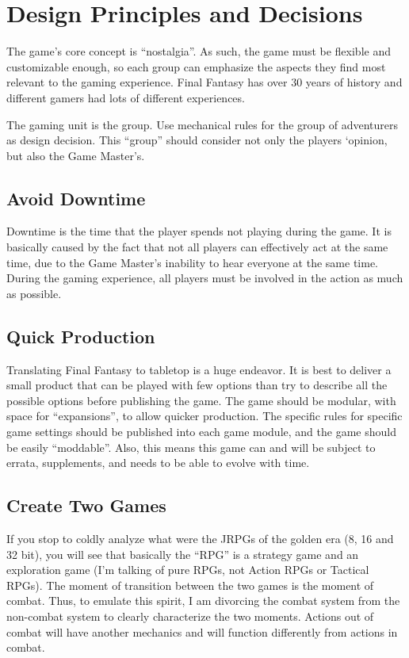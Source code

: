 \section{Design Principles and Decisions}\label{sec:design}
\begin{multicols}{2}
The game's core concept is “nostalgia”. As such, the game must be flexible and customizable enough, so each group can emphasize the aspects they find most relevant to the gaming experience. Final Fantasy has over 30 years of history and different gamers had lots of different experiences.

The gaming unit is the group. Use mechanical rules for the group of adventurers as design decision. This “group” should consider not only the players ‘opinion, but also the Game Master's.

\subsection{Avoid Downtime}\label{subsec:downtime} 
Downtime is the time that the player spends not playing during the game. It is basically caused by the fact that not all players can effectively act at the same time, due to the Game Master’s inability to hear everyone at the same time. During the gaming experience, all players must be involved in the action as much as possible.

\subsection{Quick Production}\label{subsec:production}
Translating Final Fantasy to tabletop is a huge endeavor. It is best to deliver a small product that can be played with few options than try to describe all the possible options before publishing the game. The game should be modular, with space for “expansions”, to allow quicker production. The specific rules for specific game settings should be published into each game module, and the game should be easily “moddable”. Also, this means this game can and will be subject to errata, supplements, and needs to be able to evolve with time.

\subsection{Create Two Games}\label{subsec:twogames}
If you stop to coldly analyze what were the JRPGs of the golden era (8, 16 and 32 bit), you will see that basically the “RPG” is a strategy game and an exploration game (I'm talking of pure RPGs, not Action RPGs or Tactical RPGs). The moment of transition between the two games is the moment of combat. Thus, to emulate this spirit, I am divorcing the combat system from the non-combat system to clearly characterize the two moments. Actions out of combat will have another mechanics and will function differently from actions in combat.


\end{multicols}
